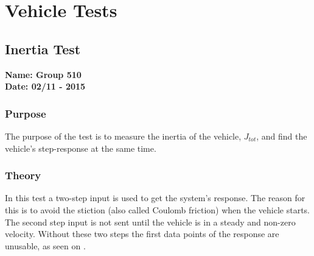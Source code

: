 \pagebreak
\section{Vehicle Tests}
\nopagebreak

\subsection{Inertia Test} %
\textbf{Name: Group 510}\\
\textbf{Date: 02/11 - 2015}

\subsubsection{Purpose}
The purpose of the test is to measure the inertia of the vehicle, $J_{tot}$, and find the vehicle's step-response at the same time.

\subsubsection{Theory}



In this test a two-step input is used to get the system's response. The reason for this is to avoid the stiction (also called Coulomb friction) when the vehicle starts. The second step input is not sent until the vehicle is in a steady and non-zero velocity. Without these two steps the first data points of the response are unusable, as seen on .


